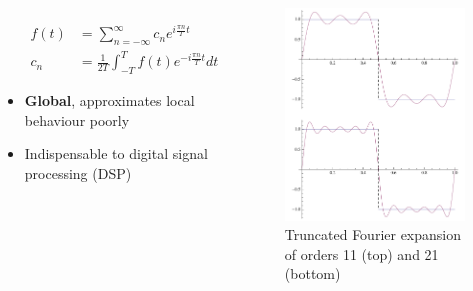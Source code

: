 \documentclass{beamer}
\begin{document}
\begin{frame}
\begin{columns}[c]
\begin{itemize}
		\begin{align}
			f(t)	&= \sum_{n=-\infty}^{\infty} c_n e^{i \frac{\pi n}{T} t} \\
			c_n		&= \frac{1}{2T} \int_{-T}^{T} f(t) e^{-i \frac{\pi n}{T} t} dt
		\end{align}
	\item \textbf{Global}, approximates local behaviour poorly
	\item Indispensable to digital signal processing (DSP)
\end{itemize}
\begin{figure} %
\centering
	\includegraphics[width=\columnwidth]{../figures/fourier}
\caption{Truncated Fourier expansion of orders 11 (top) and 21 (bottom)}
\end{figure}
\end{columns}
\end{frame}

\end{document}

